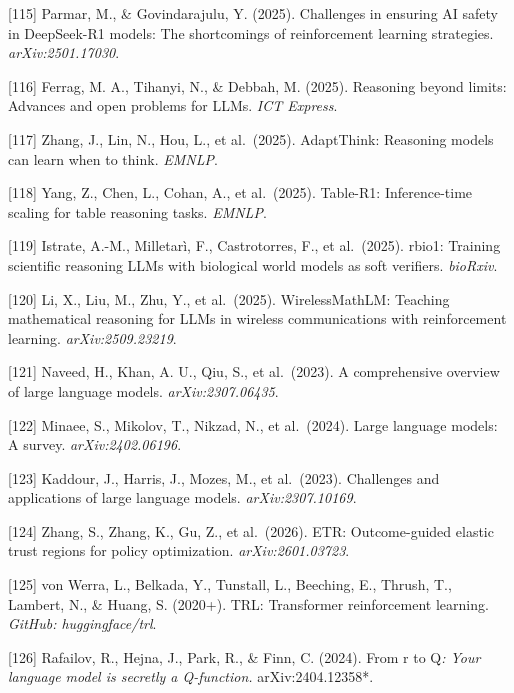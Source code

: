 {[}115{]} Parmar, M., \& Govindarajulu, Y. (2025). Challenges in ensuring AI safety in DeepSeek-R1 models: The shortcomings of reinforcement learning strategies. \emph{arXiv:2501.17030}.

{[}116{]} Ferrag, M. A., Tihanyi, N., \& Debbah, M. (2025). Reasoning beyond limits: Advances and open problems for LLMs. \emph{ICT Express}.

{[}117{]} Zhang, J., Lin, N., Hou, L., et al.~(2025). AdaptThink: Reasoning models can learn when to think. \emph{EMNLP}.

{[}118{]} Yang, Z., Chen, L., Cohan, A., et al.~(2025). Table-R1: Inference-time scaling for table reasoning tasks. \emph{EMNLP}.

{[}119{]} Istrate, A.-M., Milletarì, F., Castrotorres, F., et al.~(2025). rbio1: Training scientific reasoning LLMs with biological world models as soft verifiers. \emph{bioRxiv}.

{[}120{]} Li, X., Liu, M., Zhu, Y., et al.~(2025). WirelessMathLM: Teaching mathematical reasoning for LLMs in wireless communications with reinforcement learning. \emph{arXiv:2509.23219}.

{[}121{]} Naveed, H., Khan, A. U., Qiu, S., et al.~(2023). A comprehensive overview of large language models. \emph{arXiv:2307.06435}.

{[}122{]} Minaee, S., Mikolov, T., Nikzad, N., et al.~(2024). Large language models: A survey. \emph{arXiv:2402.06196}.

{[}123{]} Kaddour, J., Harris, J., Mozes, M., et al.~(2023). Challenges and applications of large language models. \emph{arXiv:2307.10169}.

{[}124{]} Zhang, S., Zhang, K., Gu, Z., et al.~(2026). ETR: Outcome-guided elastic trust regions for policy optimization. \emph{arXiv:2601.03723}.

{[}125{]} von Werra, L., Belkada, Y., Tunstall, L., Beeching, E., Thrush, T., Lambert, N., \& Huang, S. (2020+). TRL: Transformer reinforcement learning. \emph{GitHub: huggingface/trl}.

{[}126{]} Rafailov, R., Hejna, J., Park, R., \& Finn, C. (2024). From r to Q\emph{: Your language model is secretly a Q-function. }arXiv:2404.12358*.
